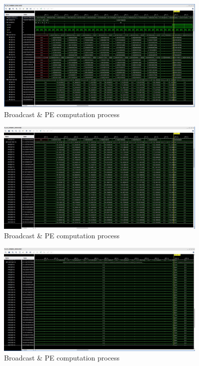 \documentclass{article}
\begin{document}
\begin{figure}[htb!]
	\centering
	\includegraphics[width=0.9\textwidth]{fig/mm1.jpg}
\caption{Broadcast \& PE computation process}
\label{fig4}
\end{figure}
\begin{figure}[htb!]
	\centering
	\includegraphics[width=0.9\textwidth]{fig/mm2.jpg}
\caption{Broadcast \& PE computation process}
\label{fig5}
\end{figure}
\begin{figure}[htb!]
	\centering
	\includegraphics[width=0.9\textwidth]{fig/mm3.jpg}
\caption{Broadcast \& PE computation process}
\label{fig6}
\end{figure}
\end{document}
